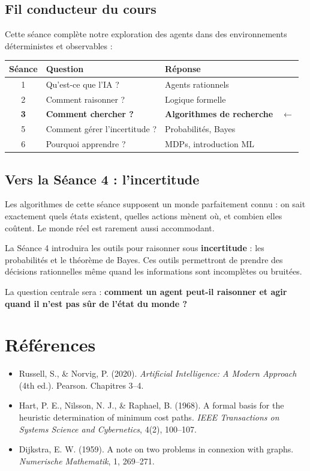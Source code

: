 \documentclass[11pt,a4paper]{article}
\newcommand{\cmark}{\ding{51}}
\begin{document}
\subsection{Fil conducteur du cours}

Cette séance complète notre exploration des agents dans des environnements déterministes et observables :

\begin{center}
\begin{tabular}{|c|l|l|c|}
\hline
\textbf{Séance} & \textbf{Question} & \textbf{Réponse} & \\
\hline
1 & Qu'est-ce que l'IA ? & Agents rationnels & \cmark \\
2 & Comment raisonner ? & Logique formelle & \cmark \\
\textbf{3} & \textbf{Comment chercher ?} & \textbf{Algorithmes de recherche} & $\leftarrow$ \\
5 & Comment gérer l'incertitude ? & Probabilités, Bayes & \\
6 & Pourquoi apprendre ? & MDPs, introduction ML & \\
\hline
\end{tabular}
\end{center}

\subsection{Vers la Séance 4 : l'incertitude}

Les algorithmes de cette séance supposent un monde parfaitement connu : on sait exactement quels états existent, quelles actions mènent où, et combien elles coûtent. Le monde réel est rarement aussi accommodant.

La Séance 4 introduira les outils pour raisonner sous \textbf{incertitude} : les probabilités et le théorème de Bayes. Ces outils permettront de prendre des décisions rationnelles même quand les informations sont incomplètes ou bruitées.

La question centrale sera : \textbf{comment un agent peut-il raisonner et agir quand il n'est pas sûr de l'état du monde ?}

\section*{Références}

\begin{itemize}
    \item Russell, S., \& Norvig, P. (2020). \textit{Artificial Intelligence: A Modern Approach} (4th ed.). Pearson. Chapitres 3--4.
    \item Hart, P. E., Nilsson, N. J., \& Raphael, B. (1968). A formal basis for the heuristic determination of minimum cost paths. \textit{IEEE Transactions on Systems Science and Cybernetics}, 4(2), 100--107.
    \item Dijkstra, E. W. (1959). A note on two problems in connexion with graphs. \textit{Numerische Mathematik}, 1, 269--271.
\end{itemize}
\end{document}
